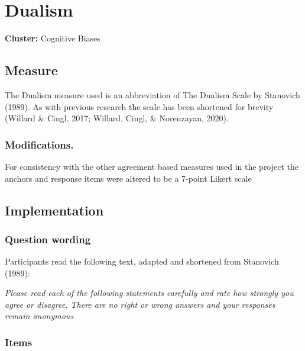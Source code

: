 \documentclass[
  letterpaper,
]{scrbook}
\begin{document}
\chapter{Dualism}\label{dualism}

\textbf{Cluster:} Cognitive Biases

\section{Measure}\label{measure-12}

The Dualism measure used is an abbreviation of The Dualism Scale by
Stanovich (1989). As with previous research the scale has been shortened
for brevity (Willard \& Cingl, 2017; Willard, Cingl, \& Norenzayan,
2020).

\subsection{Modifications.}\label{modifications.}

For consistency with the other agreement based measures used in the
project the anchors and response items were altered to be a 7-point
Likert scale

\section{Implementation}\label{implementation-12}

\subsection{Question wording}\label{question-wording-12}

Participants read the following text, adapted and shortened from
Stanovich (1989):

\emph{Please read each of the following statements carefully and rate
how strongly you agree or disagree. There are no right or wrong answers
and your responses remain anonymous}

\subsection*{Items}\label{items-12}
\end{document}
